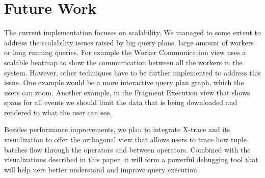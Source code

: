 \documentclass{chi2009}
\newcommand*{\fragment}{Fragment Execution\xspace}
\newcommand*{\network}{Worker Communication\xspace}
\begin{document}

\section{Future Work}

The current implementation focuses on scalability. We managed to some extent to
address the scalability issues raised by big query plans, large amount of
workers or long running queries. For example the \network view uses a
scalable heatmap to show the communication between all the workers in the
system. However, other techniques have to be further implemented to address
this issue. One example would be a more interactive query plan graph, which the
users can zoom. Another example, in the \fragment view that shows spans
for all events we should limit the data that is being downloaded and rendered
to what the user can see.

Besides performance improvements, we plan to integrate X-trace and its
visualization to offer the orthogonal view that allows users to trace how tuple
batches flow through the operators and between operators. Combined with the
visualizations described in this paper, it will form a powerful debugging tool
that will help uers better understand and improve query execution.



\end{document}
